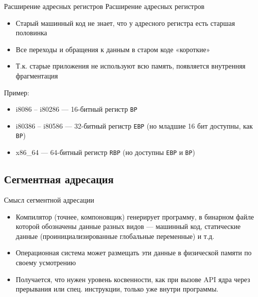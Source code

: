 \documentclass[xetex,aspectratio=43]{beamer}
\begin{document}
\begin{frame}[fragile]{Расширение адресных регистров}
    Расширение адресных регистров

    \begin{itemize}
        \tightlist
        \item
        Старый машинный код не знает, что у адресного регистра есть старшая
        половинка
        \item
        Все переходы и обращения к данным в старом коде «короткие»
        \item
        Т.к. старые приложения не используют всю память, появляется внутренняя
        фрагментация
    \end{itemize}

    \pause

    Пример:

    \begin{itemize}
        \tightlist
        \item
        i8086 -- i80286 --- 16-битный регистр \texttt{BP}
        \item
        i80386 -- i80586 --- 32-битный регистр \texttt{EBP} (но младшие 16 бит
        доступны, как \texttt{BP})
        \item
        x86\_64 --- 64-битный регистр \texttt{RBP} (но доступны \texttt{EBP} и
        \texttt{BP})
    \end{itemize}

\end{frame}

\subsection{Сегментная адресация}

\begin{frame}{Смысл сегментной адресации}
    \begin{itemize}
        \item
        Компилятор (точнее, компоновщик) генерирует программу, в бинарном
        файле которой обозначены данные разных видов --- машинный код,
        статические данные (проинициализированные глобальные переменные) и
        т.д.
        \item
        Операционная система может размещать эти данные в физической памяти по
        своему усмотрению
        \item
        Получается, что нужен уровень косвенности, как при вызове API ядра
        через прерывания или спец. инструкции, только уже внутри программы.
    \end{itemize}
\end{frame}
\end{document}
